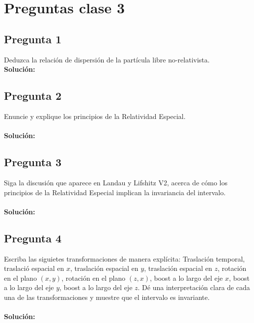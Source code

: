 \documentclass[../main_ej.tex]{subfiles}
\begin{document}
\section{Preguntas clase 3}
\subsection{Pregunta 1}
Deduzca la relación de dispersión de la partícula libre no-relativista. \\
\textbf{Solución:}
\\
\subsection{Pregunta 2}
Enuncie y explique los principios de la Relatividad Especial. \\
\\
\textbf{Solución:}
\subsection{Pregunta 3}
Siga la discusión que aparece en Landau y Lifshitz V2, acerca de cómo los principios de la Relatividad Especial implican la invariancia del intervalo. \\
\\
\textbf{Solución:}
\subsection{Pregunta 4}
Escriba las siguietes transformaciones de manera explícita: Traslación temporal, traslació espacial en $x$, traslación espacial en $y$, traslación espacial en $z$, rotación en el plano $(x,y)$, rotación en el plano $(z,x)$, boost a lo largo del eje $x$, boost a lo largo del eje $y$, boost a lo largo del eje $z$. Dé una interpretación clara de cada una de las transformaciones y muestre que el intervalo es invariante.\\
\\
\textbf{Solución:}
  





 
\end{document}
